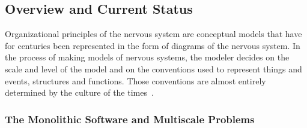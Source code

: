 \documentclass[10pt,letterpaper]{article}
\begin{document}
\subsection*{Overview and Current Status}

Organizational principles of the nervous system are conceptual models that have for centuries been represented in the form of diagrams of the nervous system. In the process of making models of nervous systems, the modeler decides on the scale and level of the model and on the conventions used to represent things and events, structures and functions. Those conventions are almost entirely determined by the culture of the times~\cite{jacobson93}.

\subsubsection*{The Monolithic Software and Multiscale Problems}

\end{document}

